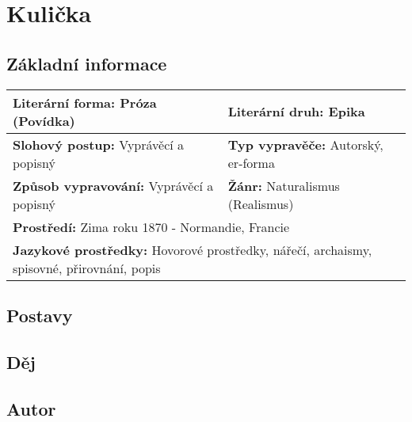 \section{Kulička}
    \subsection{Základní informace}
        \begin{center}
            \begin{tabular}{l|l}
                \textbf{Literární forma:} Próza (Povídka) & \textbf{Literární druh:} Epika\\
                \hline
                \textbf{Slohový postup:} Vyprávěcí a popisný & \textbf{Typ vypravěče:} Autorský, er-forma\\
                \hline
                \textbf{Způsob vypravování:} Vyprávěcí a popisný & \textbf{Žánr:} Naturalismus (Realismus)\\
                \hline
                \multicolumn{2}{l}{\textbf{Prostředí:} Zima roku 1870 - Normandie, Francie} \\
                \multicolumn{2}{l}{\textbf{Jazykové prostředky:} Hovorové prostředky, nářečí, archaismy, spisovné, přirovnání, popis} \\
            \end{tabular}
        \end{center}
    \subsection{Postavy}
    \subsection{Děj}
    \subsection{Autor}